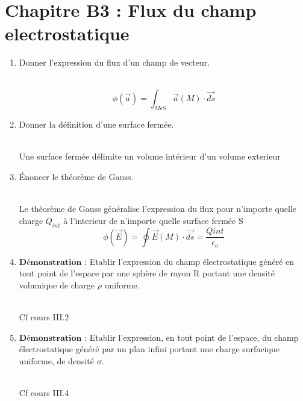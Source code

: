 \section*{\centering Chapitre B3 : Flux du champ electrostatique}
\begin{enumerate}[label=\arabic{enumi} - , left=0pt, itemsep=1em] %

    \item Donner l'expression du flux d'un champ de vecteur. \par
    \begin{solution} \\
        \[ \phi ( \vec{a}) = \int_{M \epsilon S} \vec{a}(M) \cdot \vec{ds}\]
    \end{solution}

    \item Donner la définition d'une surface fermée. \par
    \begin{solution} \\
        Une surface fermée délimite un volume intérieur d'un volume exterieur 
    \end{solution}

    \item Énoncer le théorème de Gauss. \par
    \begin{solution} \\
        Le théorème de Gauss généralise l'expression du flux pour n'importe quelle charge $Q_{int}$ à l'interieur de n'importe quelle surface fermée S\\
        \[ \phi(\vec{E}) = \oint \vec{E}(M) \cdot \vec{ds} = \frac{Qint}{\epsilon_o}\]
    \end{solution}

    \item $\textbf{Démonstration :}$ Etablir l’expression du champ électrostatique généré en tout point de l’espace par une
    sphère de rayon R portant une densité volumique de charge $\rho$ uniforme. \par
    \begin{solution} \\
        Cf cours III.2
    \end{solution}

    \item $\textbf{Démonstration :}$ Etablir l’expression, en tout point de l’espace, du champ électrostatique généré par un
    plan infini portant une charge surfacique uniforme, de densité $\sigma$. \par
    \begin{solution} \\
        Cf cours III.4
    \end{solution}


\end{enumerate}
